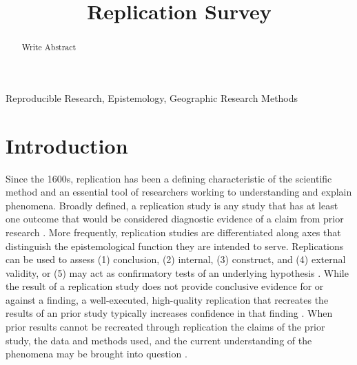 \documentclass[]{interact}
\theoremstyle{plain}%
\theoremstyle{definition}
\theoremstyle{remark}
\begin{document}

\title{Replication Survey}

\author{
}

\maketitle

\begin{abstract}
Write Abstract

\end{abstract}

\begin{keywords}
Reproducible Research, Epistemology, Geographic Research Methods
\end{keywords}

\newpage
\section*{Introduction}
Since the 1600s, replication has been a defining characteristic of the scientific method and an essential tool of researchers working to understanding and explain phenomena. 
Broadly defined, a replication study is any study that has at least one outcome that would be considered diagnostic evidence of a claim from prior research \citep{nosek2020}.
More frequently, replication studies are differentiated along axes that distinguish the epistemological function they are intended to serve. 
Replications can be used to assess (1) conclusion, (2) internal, (3) construct, and (4) external validity, or (5) may act as confirmatory tests of an underlying hypothesis \citep[see][]{schmidt2009, gomez2010replications, radder2003, radder2012}. 
While the result of a replication study does not provide conclusive evidence for or against a finding, a well-executed, high-quality replication that recreates the results of an prior study typically increases confidence in that finding \citep{earp2015, nichols2021}. 
When prior results cannot be recreated through replication the claims of the prior study, the data and methods used, and the current understanding of the phenomena may be brought into question \citep{christensen2019, NASEM2019}.
\end{document}
